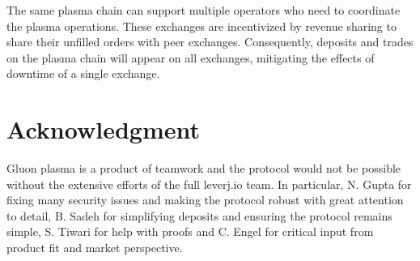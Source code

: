 \documentclass[12pt,a4paper]{article}
\begin{document}
The same plasma chain can support multiple operators who need to coordinate the plasma operations. These exchanges are incentivized by revenue sharing to share their unfilled orders with peer exchanges. Consequently, deposits and trades on the plasma chain will appear on all exchanges, mitigating the effects of downtime of a single exchange.

\section*{Acknowledgment}
Gluon plasma is a product of teamwork and the protocol would not be possible without the extensive efforts of the full leverj.io team. In particular, N. Gupta for fixing many security issues and making the protocol robust with great attention to detail, B. Sadeh for simplifying deposits and ensuring the protocol remains simple, S. Tiwari for help with proofs and C. Engel for critical input from product fit and market perspective.
\end{document}
